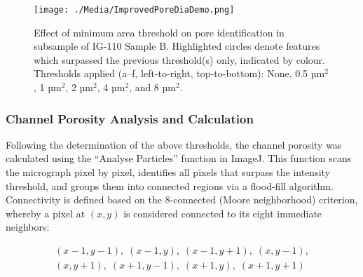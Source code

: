 \documentclass[3p,twocolumn]{elsarticle}
\begin{document}
   \begin{table}
  \centering
  \caption{Effect of different pore area thresholds on a subsection of IG-430F, showing the resulting pore count, total area, average pore size, and percentage area.}
  \label{tab:thresholdsandvariationsIG430F}
\end{table}

\begin{figure}[!htbp]
    \centering
    \texttt{[image: ./Media/ImprovedPoreDiaDemo.png]}
    \caption{Effect of minimum area threshold on pore identification in subsample of IG-110 Sample B. Highlighted circles denote features which surpassed the previous threshold(s) only, indicated by colour. Thresholds applied (a–f, left-to-right, top-to-bottom): None, 0.5 µm\(^2\), 1 µm\(^2\), 2 µm\(^2\), 4 µm\(^2\), and 8 µm\(^2\).}
    \label{fig:improvedporediademo}
\end{figure}

\subsubsection{Channel Porosity Analysis and Calculation}
Following the determination of the above thresholds, the channel porosity was
calculated using the “Analyse Particles” function in ImageJ. This function scans
the micrograph pixel by pixel, identifies all pixels that surpass the intensity
threshold, and groups them into connected regions via a flood-fill algorithm.
Connectivity is defined based on the 8-connected (Moore neighborhood) criterion,
whereby a pixel at $(x,y)$ is considered connected to its eight immediate
neighbors:

\begin{multline*}
(x-1,y-1),\; (x-1,y),\; (x-1,y+1),\; (x,y-1),\\[4pt]
(x,y+1),\; (x+1,y-1),\; (x+1,y),\; (x+1,y+1)
\end{multline*}
\end{document}
